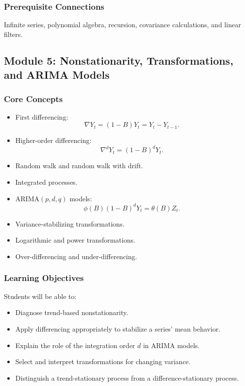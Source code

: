 \documentclass[11pt]{article}
\begin{document}
\subsubsection{Prerequisite Connections}

Infinite series, polynomial algebra, recursion, covariance calculations, and
linear filters.

\subsection{Module 5: Nonstationarity, Transformations, and ARIMA Models}

\subsubsection{Core Concepts}

\begin{itemize}
    \item First differencing:
    \[
    \nabla Y_t = (1-B)Y_t = Y_t-Y_{t-1}.
    \]
    \item Higher-order differencing:
    \[
    \nabla^dY_t=(1-B)^dY_t.
    \]
    \item Random walk and random walk with drift.
    \item Integrated processes.
    \item ARIMA\((p,d,q)\) models:
    \[
    \phi(B)(1-B)^dY_t=\theta(B)Z_t.
    \]
    \item Variance-stabilizing transformations.
    \item Logarithmic and power transformations.
    \item Over-differencing and under-differencing.
\end{itemize}

\subsubsection{Learning Objectives}

Students will be able to:

\begin{itemize}
    \item Diagnose trend-based nonstationarity.
    \item Apply differencing appropriately to stabilize a series' mean behavior.
    \item Explain the role of the integration order \(d\) in ARIMA models.
    \item Select and interpret transformations for changing variance.
    \item Distinguish a trend-stationary process from a difference-stationary
    process.
\end{itemize}
\end{document}
